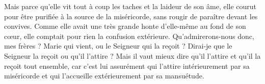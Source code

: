  Mais parce qu’elle vit tout à coup les taches et la laideur de son âme, elle courut pour être purifiée à la source de la miséricorde, sans rougir de paraître devant les convives. Comme elle avait une très grande honte d’elle-même au fond de son cœur, elle comptait pour rien la confusion extérieure. Qu’admirerons-nous donc, mes frères ? Marie qui vient, ou le Seigneur qui la reçoit ? Dirai-je que le Seigneur la reçoit ou qu’il l’attire ? Mais il vaut mieux dire qu’il l’attire et qu’il la reçoit tout ensemble, car c’est lui assurément qui l’attire intérieurement par sa miséricorde et qui l’accueille extérieurement par sa mansuétude.